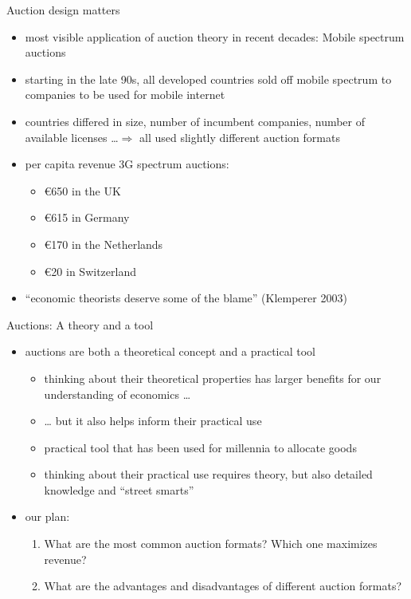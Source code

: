 \documentclass[bigger]{beamer}
\begin{document}
\begin{frame}[label={sec:orgcd9f73b}]{Auction design matters}
\begin{itemize}
\item most visible application of auction theory in recent decades: Mobile spectrum auctions
\item starting in the late 90s, all developed countries sold off mobile spectrum to companies to be used for mobile internet
\item countries differed in size, number of incumbent companies, number of available licenses \ldots{}\linebreak \(\Rightarrow\)  all used slightly different auction formats
\item per capita revenue 3G spectrum auctions:
\begin{itemize}
\item €650 in the UK
\item €615 in Germany
\item €170 in the Netherlands
\item €20 in Switzerland
\end{itemize}
\item “economic theorists deserve some of the blame” (Klemperer 2003)
\end{itemize}
\end{frame}

\begin{frame}[label={sec:org88cd049}]{Auctions: A theory and a tool}
\begin{itemize}
\item auctions are both a theoretical concept and a practical tool
\begin{itemize}
\item thinking about their theoretical properties has larger beneﬁts for our understanding of economics \ldots{}
\item \ldots{} but it also helps inform their practical use
\item practical tool that has been used for millennia to allocate goods
\item thinking about their practical use requires theory, but also detailed knowledge and “street smarts”
\end{itemize}
\item our plan:
\begin{enumerate}
\item What are the most common auction formats? Which one maximizes revenue?
\item What are the advantages and disadvantages of different auction formats?
\end{enumerate}
\end{itemize}
\end{frame}
\end{document}
